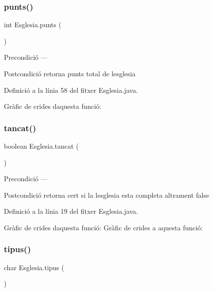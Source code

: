 \subsubsection{\texorpdfstring{punts()}{punts()}}
{\footnotesize\ttfamily int Esglesia.\+punts (\begin{DoxyParamCaption}{ }\end{DoxyParamCaption})}

\begin{DoxyPrecond}{Precondició}
--- 
\end{DoxyPrecond}
\begin{DoxyPostcond}{Postcondició}
retorna punts total de l\textquotesingle{}esglesia 
\end{DoxyPostcond}


Definició a la línia 58 del fitxer Esglesia.\+java.

Gràfic de crides d\textquotesingle{}aquesta funció\+:
\mbox{\label{class_esglesia_a9e2478307777515b1bf7a3d138c55e92}} 
\subsubsection{\texorpdfstring{tancat()}{tancat()}}
{\footnotesize\ttfamily boolean Esglesia.\+tancat (\begin{DoxyParamCaption}{ }\end{DoxyParamCaption})}

\begin{DoxyPrecond}{Precondició}
--- 
\end{DoxyPrecond}
\begin{DoxyPostcond}{Postcondició}
retorna cert si la l\textquotesingle{}esglesia esta completa altrament false 
\end{DoxyPostcond}


Definició a la línia 19 del fitxer Esglesia.\+java.

Gràfic de crides d\textquotesingle{}aquesta funció\+:
Gràfic de crides a aquesta funció\+:
\mbox{\label{class_esglesia_a515988e0b57758b8da5c4c2351cace07}} 
\subsubsection{\texorpdfstring{tipus()}{tipus()}}
{\footnotesize\ttfamily char Esglesia.\+tipus (\begin{DoxyParamCaption}{ }\end{DoxyParamCaption})}

